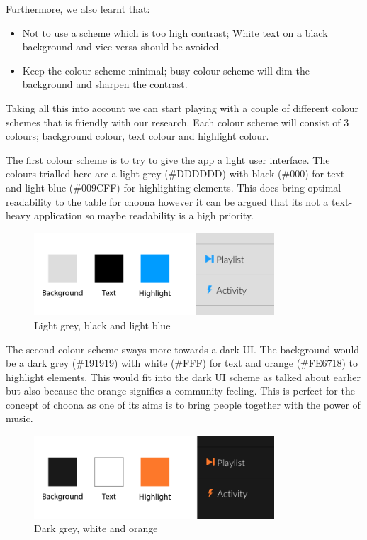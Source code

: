 \noindent Furthermore, we also learnt that:
\begin{itemize}
\item Not to use a scheme which is too high contrast; White text on a black background and vice versa should be avoided.
\item Keep the colour scheme minimal; busy colour scheme will dim the background and sharpen the contrast.
\end{itemize}

Taking all this into account we can start playing with a couple of different colour schemes that is friendly with our research. Each colour scheme will consist of 3 colours; background colour, text colour and highlight colour. 

The first colour scheme is to try to give the app a light user interface. The colours trialled here are a light grey (\#DDDDDD) with black (\#000) for text and light blue (\#009CFF) for highlighting elements. This does bring optimal readability to the table for choona however it can be argued that its not a text-heavy application so maybe readability is a high priority.\\

\begin{figure}[h!]
    \centering
        \includegraphics[width=0.8\textwidth]{./img/greybluecolours.png}
        \caption{Light grey, black and light blue}
        \label{fig:bluegrey}
\end{figure}

The second colour scheme sways more towards a dark UI. The background would be a dark grey (\#191919)  with white (\#FFF) for text and orange (\#FE6718) to highlight elements. This would fit into the dark UI scheme as talked about earlier but also because the orange signifies a community feeling. This is perfect for the concept of choona as one of its aims is to bring people together with the power of music. \\

\begin{figure}[h!]
\centering
\includegraphics[width=0.8\textwidth]{./img/greyorangecolours.png}
\caption{Dark grey, white and orange}
\label{fig:orangegrey}
\end{figure}

